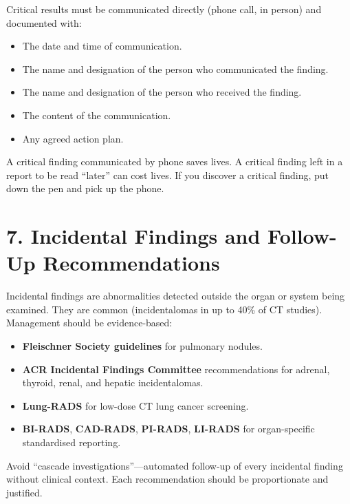 Critical results must be communicated directly (phone call, in person) and documented with:
\begin{itemize}
    \item The date and time of communication.
    \item The name and designation of the person who communicated the finding.
    \item The name and designation of the person who received the finding.
    \item The content of the communication.
    \item Any agreed action plan.
\end{itemize}

\begin{pearlbox}
A critical finding communicated by phone saves lives. A critical finding left in a report to be read ``later'' can cost lives. If you discover a critical finding, put down the pen and pick up the phone.
\end{pearlbox}


\section*{7. Incidental Findings and Follow-Up Recommendations}
Incidental findings are abnormalities detected outside the organ or system being examined. They are common (incidentalomas in up to 40\% of CT studies). Management should be evidence-based:
\begin{itemize}
    \item \textbf{Fleischner Society guidelines} for pulmonary nodules.
    \item \textbf{ACR Incidental Findings Committee} recommendations for adrenal, thyroid, renal, and hepatic incidentalomas.
    \item \textbf{Lung-RADS} for low-dose CT lung cancer screening.
    \item \textbf{BI-RADS}, \textbf{CAD-RADS}, \textbf{PI-RADS}, \textbf{LI-RADS} for organ-specific standardised reporting.
\end{itemize}

Avoid ``cascade investigations''---automated follow-up of every incidental finding without clinical context. Each recommendation should be proportionate and justified.

\clearpage
